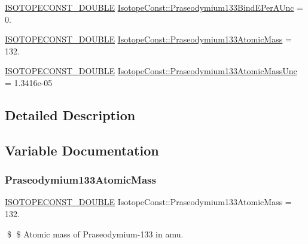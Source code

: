 \begin{DoxyCompactItemize}
\item 
\mbox{\hyperlink{group___isotope_const-_macros_ga8f45a7272ce02c0b4c65c44636ed719a}{I\+S\+O\+T\+O\+P\+E\+C\+O\+N\+S\+T\+\_\+\+D\+O\+U\+B\+LE}} \mbox{\hyperlink{group___isotope_const-_praseodymium-_pr133_ga7a0d1f34fd39a7a2bcc9893e132b150b}{Isotope\+Const\+::\+Praseodymium133\+Bind\+E\+Per\+A\+Unc}} = 0.
\item 
\mbox{\hyperlink{group___isotope_const-_macros_ga8f45a7272ce02c0b4c65c44636ed719a}{I\+S\+O\+T\+O\+P\+E\+C\+O\+N\+S\+T\+\_\+\+D\+O\+U\+B\+LE}} \mbox{\hyperlink{group___isotope_const-_praseodymium-_pr133_gad605b8713d6cbb87cf2d9666fd3c84a0}{Isotope\+Const\+::\+Praseodymium133\+Atomic\+Mass}} = 132.
\item 
\mbox{\hyperlink{group___isotope_const-_macros_ga8f45a7272ce02c0b4c65c44636ed719a}{I\+S\+O\+T\+O\+P\+E\+C\+O\+N\+S\+T\+\_\+\+D\+O\+U\+B\+LE}} \mbox{\hyperlink{group___isotope_const-_praseodymium-_pr133_ga4348abffdcdccd690971270e76170082}{Isotope\+Const\+::\+Praseodymium133\+Atomic\+Mass\+Unc}} = 1.\+3416e-\/05
\end{DoxyCompactItemize}


\subsection{Detailed Description}


\subsection{Variable Documentation}
\mbox{\label{group___isotope_const-_praseodymium-_pr133_gad605b8713d6cbb87cf2d9666fd3c84a0}} 
\subsubsection{\texorpdfstring{Praseodymium133\+Atomic\+Mass}{Praseodymium133AtomicMass}}
{\footnotesize\ttfamily \mbox{\hyperlink{group___isotope_const-_macros_ga8f45a7272ce02c0b4c65c44636ed719a}{I\+S\+O\+T\+O\+P\+E\+C\+O\+N\+S\+T\+\_\+\+D\+O\+U\+B\+LE}} Isotope\+Const\+::\+Praseodymium133\+Atomic\+Mass = 132.}

\$ \$ Atomic mass of Praseodymium-\/133 in amu. \mbox{\label{group___isotope_const-_praseodymium-_pr133_ga4348abffdcdccd690971270e76170082}} 
